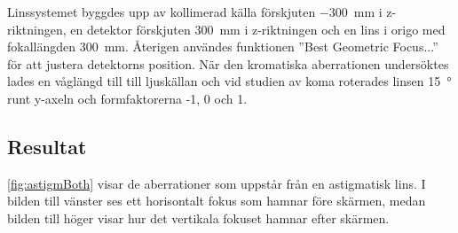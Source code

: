 \documentclass[a4paper]{article}
\begin{document}
Linssystemet byggdes upp av kollimerad källa förskjuten \SI{-300}{\milli\meter} i z-riktningen, en detektor förskjuten \SI{300}{\milli\meter} i z-riktningen och en lins i origo med fokallängden \SI{300}{\milli\meter}. Återigen användes funktionen ”Best Geometric Focus...” för att justera detektorns position. När den kromatiska aberrationen undersöktes lades en våglängd till till ljuskällan och vid studien av koma roterades linsen \SI{15}{\degree} runt y-axeln och formfaktorerna -1, 0 och 1.

\subsection{Resultat}

\autoref{fig:astigmBoth} visar de aberrationer som uppstår från en astigmatisk lins. I bilden till vänster ses ett horisontalt fokus som hamnar före skärmen, medan bilden till höger visar hur det vertikala fokuset hamnar efter skärmen.
\end{document}
